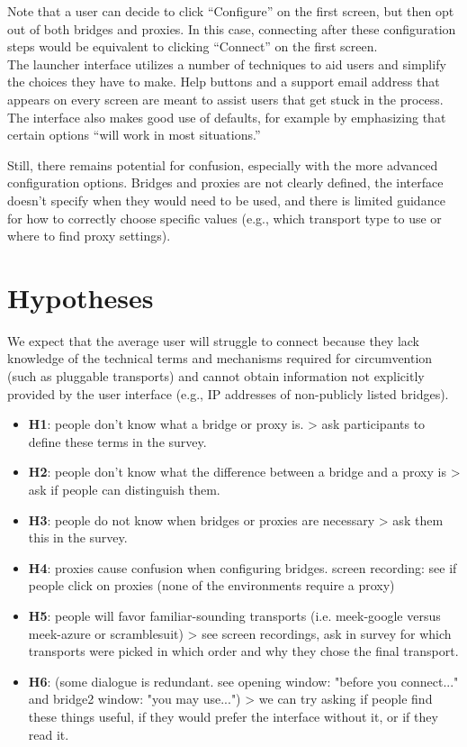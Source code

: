 \documentclass{template}
\begin{document}
Note that a user can decide to click ``Configure'' on the first screen, but then
opt out of both bridges and proxies.
In this case, connecting after these configuration steps
would be equivalent to clicking ``Connect'' on the first screen. \\ 

The launcher interface utilizes a number of techniques to aid users and simplify
the choices they have to make. Help buttons and a support email address that
appears on every screen are meant to assist users that get stuck in the process.
The interface also makes good use of defaults, for example by emphasizing that
certain options ``will work in most situations.''

Still, there remains potential for confusion, especially with the more advanced
configuration options. Bridges and proxies are not clearly defined, the
interface doesn't specify when they would need to be used, and there is limited
guidance for how to correctly choose specific values (e.g., which transport type
to use or where to find proxy settings).

\section{Hypotheses}
We expect that the average user will
struggle to connect because they lack knowledge of the technical terms and
mechanisms required for circumvention (such as pluggable transports) and cannot
obtain information not explicitly provided by the user interface (e.g., IP
addresses of non-publicly listed bridges).

\begin{itemize} \itemsep1pt \parskip0pt 
\item  {\bfseries H1}: people don't know what a bridge or proxy is. > ask participants to define these terms in the survey.  
\item  {\bfseries H2}: people don't know what the difference between a bridge and a proxy is > ask if people can distinguish them. 
\item  {\bfseries H3}: people do not know when bridges or proxies are necessary > ask them this in the survey.  
\item  {\bfseries H4}: proxies cause confusion when configuring bridges. screen recording: see if people click on proxies (none of the environments require a proxy)
\item  {\bfseries H5}: people will favor familiar-sounding transports (i.e. meek-google versus meek-azure or scramblesuit) > see screen recordings, ask in survey for which transports were picked in which order and why they chose the final transport.  
\item {\bfseries H6}: (some dialogue is redundant. see opening window: "before you connect..." and bridge2 window: "you may use...") > we can try asking if people find these things useful, if they would prefer the interface without it, or if they read it.  
\end{itemize} 
\end{document}
